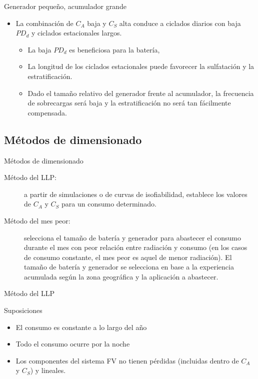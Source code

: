 \documentclass[xcolor={usenames,svgnames,dvipsnames}]{beamer}
\begin{document}
\begin{frame}[label=sec-1-3-3]{Generador pequeño, acumulador grande}
\begin{itemize}
\item La \alert{combinación de $C_{A}$ baja y $C_{S}$ alta} conduce a ciclados
diarios con baja $PD_{d}$ y ciclados estacionales largos.

\begin{itemize}
\item La baja $PD_{d}$ es beneficiosa para la batería,

\item La longitud de los ciclados estacionales puede favorecer la
sulfatación y la estratificación.

\item Dado el tamaño relativo del generador frente al acumulador, la
frecuencia de sobrecargas será baja y la estratificación no será
tan fácilmente compensada.
\end{itemize}
\end{itemize}
\end{frame}

\subsection{Métodos de dimensionado}
\label{sec-1-4}
\begin{frame}[label=sec-1-4-1]{Métodos de dimensionado}
\begin{description}
\item[{Método del LLP:}] a partir de simulaciones o de curvas de
isofiabilidad, establece los valores de $C_{A}$ y $C_{S}$ para un
consumo determinado.

\item[{Método del mes peor:}] selecciona el tamaño de batería y generador
para abastecer el consumo durante el mes con peor relación entre
radiación y consumo (en los casos de consumo constante, el mes peor
es aquel de menor radiación). El tamaño de batería y generador se
selecciona en base a la experiencia acumulada según la zona
geográfica y la aplicación a abastecer.
\end{description}
\end{frame}

\begin{frame}[label=sec-1-4-2]{Método del LLP}
\begin{block}{Suposiciones}
\begin{itemize}
\item El consumo es constante a lo largo del año

\item Todo el consumo ocurre por la noche

\item Los componentes del sistema FV no tienen pérdidas (incluidas dentro
de $C_{A}$ y $C_{S}$) y lineales.
\end{itemize}
\end{block}
\end{frame}
\end{document}
